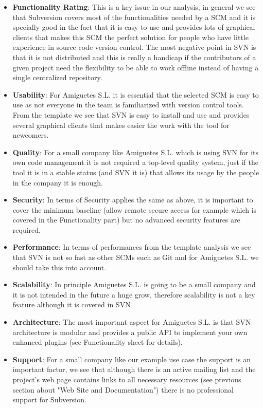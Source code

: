 \documentclass[a4paper,10pt]{article}
\begin{document}
\begin{itemize}
\item \textbf{Functionality Rating}: This is a key issue in our analysis, in general we see that Subversion covers most of the functionalities needed by a SCM and it is specially good in the fact that it is easy to use and provides lots of graphical clients that makes this SCM the perfect solution for people who have little experience in source code version control. The most negative point in SVN is that it is not distributed and this is really a handicap if the contributors of a given project need the flexibility to be able to work offline instead of having a single centralized repository.
\item \textbf{Usability}: For Amiguetes S.L. it is essential that the selected
SCM is easy to use as not everyone in the team is familiarized with version
control tools. From the template we see that SVN is easy to install and use and
provides several graphical clients that makes easier the work with the tool for
newcomers.
\item \textbf{Quality}: For a small company like Amiguetes S.L. which is using SVN for its own code management it is not required a top-level quality system, just if the tool it is in a stable status (and SVN it is) that allows its usage by the people in the company it is enough. 
\item \textbf{Security}: In terms of Security applies the same as above, it is
important to cover the minimum baseline (allow remote secure access for example
which is covered in the Functionality part) but no advanced security features
are required.
\item \textbf{Performance}: In terms of performances from the template analysis we see that SVN is not so fast as other SCMs such as Git and for Amiguetes S.L. we should take this into account.
\item \textbf{Scalability}: In principle Amiguetes S.L. is going to be a small company and it is not intended in the future a huge grow, therefore scalability is not a key feature although it is covered in SVN
\item \textbf{Architecture}: The most important aspect for Amiguetes S.L. is that SVN architecture is modular and provides a public API to implement your own enhanced plugins (see Functionality sheet for details).
\item \textbf{Support}: For a small company like our example use case the support is an important factor, we see that although there is an active mailing list and the project's web page contains links to all necessary resources (see previous section about "Web Site and Documentation") there is no professional support for Subversion.

\end{itemize}
\end{document}
